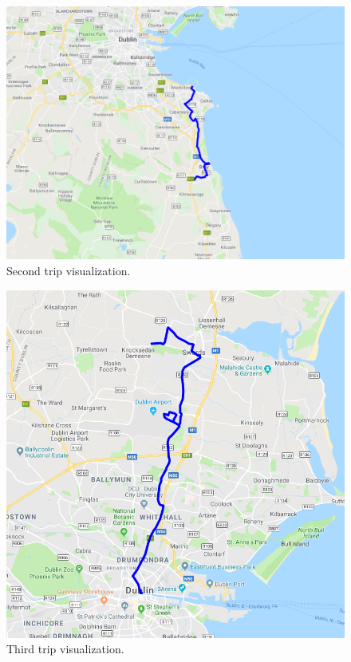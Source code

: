 \documentclass[12pt]{article}
\begin{document}
	\begin{figure} [H]
		\begin{center}
			\includegraphics [scale = 0.60] {questionC2.png}
			\caption{Second trip visualization.}
		\end{center}
		\label{gmlplot_example}
	\end{figure}

	\begin{figure} [H]
		\begin{center}
			\includegraphics [scale = 0.75] {questionC3.png}
			\caption{Third trip visualization.}
		\end{center}
		\label{gmlplot_example}
	\end{figure}
\end{document}
